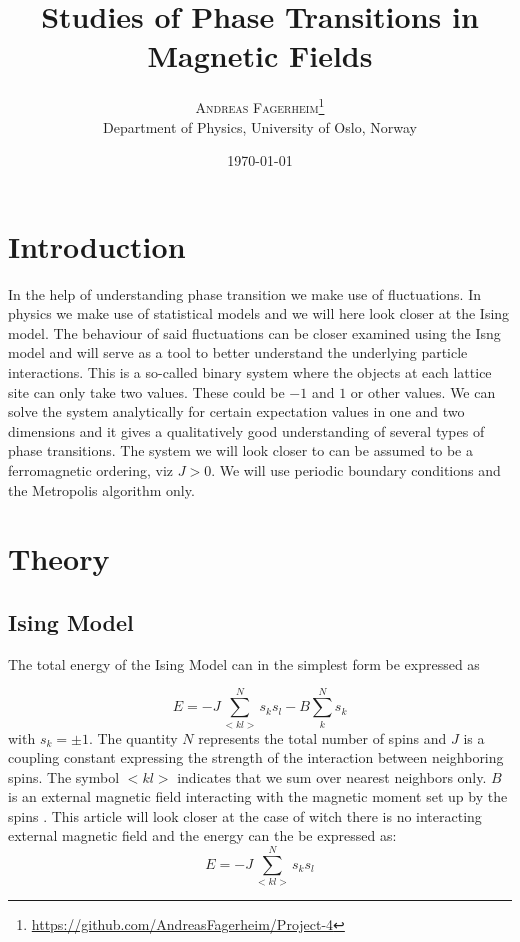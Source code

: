 \documentclass[twoside,twocolumn]{article}
\title{Studies of Phase Transitions in Magnetic Fields } %
\author{%
\textsc{Andreas Fagerheim}\thanks{\url{https://github.com/AndreasFagerheim/Project-4}} \\[1ex] %
\normalsize Department of Physics, University of Oslo, Norway \\ %
}
\date{\today} %
\begin{document}
\maketitle

\section{Introduction}

In the help of understanding phase transition we make use of fluctuations. In physics we make use of statistical models and we will here look closer at the Ising model. The behaviour of said fluctuations can be closer examined using the Isng model and will serve as a tool to better understand the underlying particle interactions. This is a so-called binary system where the objects at each lattice site can only take two values. These could be $-1$ and $1$ or other values.  We can solve the system analytically for certain expectation values in one and two dimensions and it gives a qualitatively  good understanding of several types of phase transitions. The system we will look closer to can be assumed to be a ferromagnetic ordering, viz $J> 0$.  We will use periodic boundary conditions and
the Metropolis algorithm only.

\section{Theory}


\subsection{ Ising Model }
The total energy of the Ising Model can in the simplest form be expressed as

\[
E=-J\sum_{< kl >}^{N}s_ks_l - B \sum_{ k }^{N}s_k
\]
with
$s_k=\pm 1$. The quantity $N$ represents the total number of spins and $J$ is a coupling
constant expressing the strength of the interaction between
neighboring spins.  The symbol $<kl>$ indicates that we sum over
nearest neighbors only. $B$ is an external magnetic field interacting with the magnetic moment set up by the spins \cite{Hjorth-Jensen:2015dg}. This article will look closer at the case of witch there is no interacting external magnetic field and the energy can the be expressed as:
\begin{equation}
E=-J\sum_{< kl >}^{N}s_ks_l
\end{equation}
\end{document}
